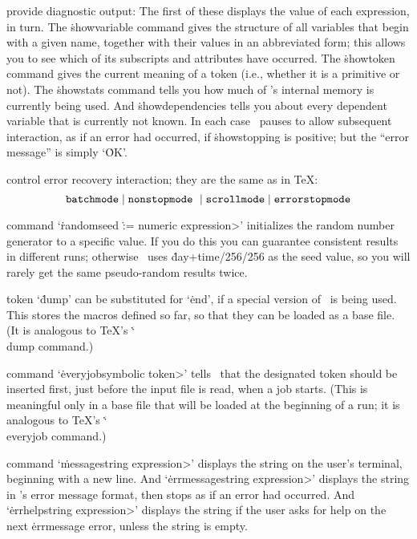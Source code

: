  provide diagnostic output:
The first of these displays the value of each expression, in turn.
The \.{showvariable} command gives the structure of all variables that begin
with a given name, together with their values in an abbreviated form;
this allows you to see which of its subscripts and attributes have
occurred. The \.{showtoken} command gives the current meaning
of a token (i.e., whether it is a primitive or not).
The \.{showstats} command tells you how much of \MF's internal memory is
currently being used.
And \.{showdependencies} tells you about every dependent variable
that is currently not known.
 In each case \MF\
pauses to allow subsequent interaction, as if an error had occurred,
if \.{showstopping} is positive;
but the ``error message'' is simply `\.{OK}'.

 control error recovery interaction; they
are the same as in \TeX:
$$\hbox{\hbox{\tt batchmode}$\;\mid\;$\hbox{\tt nonstopmode}
 $\;\mid\;$\hbox{\tt scrollmode}$\;\mid\;$\hbox{\tt errorstopmode}}$$

\@The command `\.{randomseed} \.{:=} \<numeric expression>'
initializes the random number generator to a specific value. If you
do this you can guarantee consistent results in different runs;
otherwise \MF\ uses \.{day+time/256/256} as the seed value, so
you will rarely get the same pseudo-random results twice.

\@The token `\.{dump}' can be substituted for `\.{end}', if a special
version of \MF\ is being used. This stores the macros defined so
far, so that they can be loaded as a base file. (It is analogous
to \TeX's \.{\char`\\dump} command.)

\@The command `\.{everyjob}\<symbolic token>' tells \MF\ that
the designated token should be inserted first, just before the
input file is read, when a job starts. (This is meaningful only
in a base file that will be loaded at the beginning of a run;
it is analogous to \TeX's \.{\char`\\everyjob} command.)

\@The command `\.{message}\<string expression>' displays the string
on the user's terminal, beginning with a new line. And
`\.{errmessage}\<string expression>' displays the string in
\MF's error message format, then stops as if an error had occurred.
And `\.{errhelp}\<string expression>' displays the string if the
user asks for help on the next \.{errmessage} error, unless the
string is empty.

